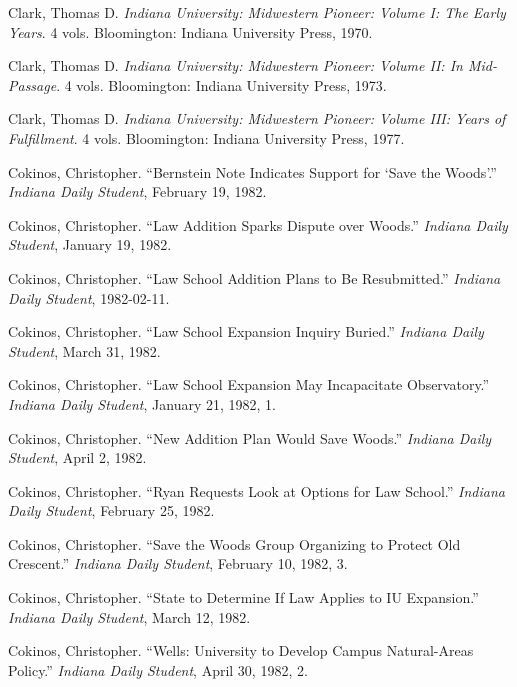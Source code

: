 \documentclass[
  american,
  letterpaper,
]{scrreprt}
\newlength{\cslhangindent}
\newenvironment{CSLReferences}[2] %
 {\begin{list}{}{%
  \setlength{\itemindent}{0pt}
  \setlength{\leftmargin}{0pt}
  \setlength{\parsep}{0pt}
  \ifodd #1
   \setlength{\leftmargin}{\cslhangindent}
   \setlength{\itemindent}{-1\cslhangindent}
  \fi
  \setlength{\itemsep}{#2\baselineskip}}}
 {\end{list}}
\begin{document}
\begin{CSLReferences}{1}{0}
Clark, Thomas D. \emph{Indiana University: Midwestern Pioneer: Volume
{I}: The Early Years}. 4 vols. Bloomington: Indiana University Press,
1970.

Clark, Thomas D. \emph{Indiana University: Midwestern Pioneer: Volume
{II}: In Mid-Passage}. 4 vols. Bloomington: Indiana University Press,
1973.

Clark, Thomas D. \emph{Indiana University: Midwestern Pioneer: Volume
{III}: Years of Fulfillment}. 4 vols. Bloomington: Indiana University
Press, 1977.

Cokinos, Christopher. {``Bernstein Note Indicates Support for {`Save the
Woods'}.''} \emph{Indiana Daily Student}, February 19, 1982.

Cokinos, Christopher. {``Law Addition Sparks Dispute over Woods.''}
\emph{Indiana Daily Student}, January 19, 1982.

Cokinos, Christopher. {``Law School Addition Plans to Be Resubmitted.''}
\emph{Indiana Daily Student}, 1982-02-11.

Cokinos, Christopher. {``Law School Expansion Inquiry Buried.''}
\emph{Indiana Daily Student}, March 31, 1982.

Cokinos, Christopher. {``Law School Expansion May Incapacitate
Observatory.''} \emph{Indiana Daily Student}, January 21, 1982, 1.

Cokinos, Christopher. {``New Addition Plan Would Save Woods.''}
\emph{Indiana Daily Student}, April 2, 1982.

Cokinos, Christopher. {``Ryan Requests Look at Options for Law
School.''} \emph{Indiana Daily Student}, February 25, 1982.

Cokinos, Christopher. {``Save the Woods Group Organizing to Protect Old
Crescent.''} \emph{Indiana Daily Student}, February 10, 1982, 3.

Cokinos, Christopher. {``State to Determine If Law Applies to IU
Expansion.''} \emph{Indiana Daily Student}, March 12, 1982.

Cokinos, Christopher. {``Wells: University to Develop Campus
Natural-Areas Policy.''} \emph{Indiana Daily Student}, April 30, 1982,
2.


\end{CSLReferences}
\end{document}
